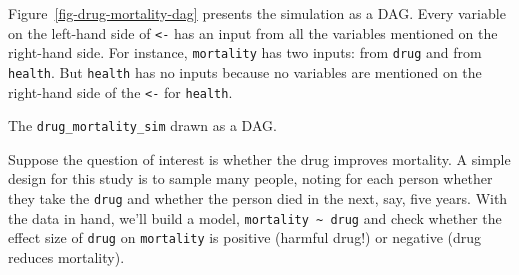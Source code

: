 \documentclass[
  letterpaper,
  DIV=11,
  numbers=noendperiod,
  oneside]{scrartcl}
\begin{document}
Figure~\ref{fig-drug-mortality-dag} presents the simulation as a DAG.
Every variable on the left-hand side of \texttt{\textless{}-} has an
input from all the variables mentioned on the right-hand side. For
instance, \texttt{mortality} has two inputs: from \texttt{drug} and from
\texttt{health}. But \texttt{health} has no inputs because no variables
are mentioned on the right-hand side of the \texttt{\textless{}-} for
\texttt{health}.

\begin{marginfigure}


\caption{\label{fig-drug-mortality-dag}The \texttt{drug\_mortality\_sim}
drawn as a DAG.}

\end{marginfigure}%

Suppose the question of interest is whether the drug improves mortality.
A simple design for this study is to sample many people, noting for each
person whether they take the \texttt{drug} and whether the person died
in the next, say, five years. With the data in hand, we'll build a
model, \texttt{mortality\ \textasciitilde{}\ drug} and check whether the
effect size of \texttt{drug} on \texttt{mortality} is positive (harmful
drug!) or negative (drug reduces mortality).
\end{document}
